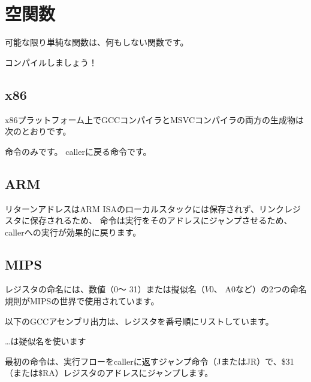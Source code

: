 \section{空関数}
\label{empty_func}

可能な限り単純な関数は、何もしない関数です。



コンパイルしましょう！

\subsection{x86}

x86プラットフォーム上でGCCコンパイラとMSVCコンパイラの両方の生成物は次のとおりです。



\RET 命令のみです。 \gls{caller}に戻る命令です。

\subsection{ARM}



リターンアドレスはARM \ac{ISA}のローカルスタックには保存されず、リンクレジスタに保存されるため、
命令は実行をそのアドレスにジャンプさせるため、\gls{caller}への実行が効果的に戻ります。

\subsection{MIPS}

レジスタの命名には、数値（$ 0〜$ 31）または擬似名（$ V0、$ A0など）の2つの命名規則がMIPSの世界で使用されています。

以下のGCCアセンブリ出力は、レジスタを番号順にリストしています。



\dots \IDA は疑似名を使います



最初の命令は、実行フローを\gls{caller}に返すジャンプ命令（JまたはJR）で、\$31（または\$RA）レジスタのアドレスにジャンプします。

